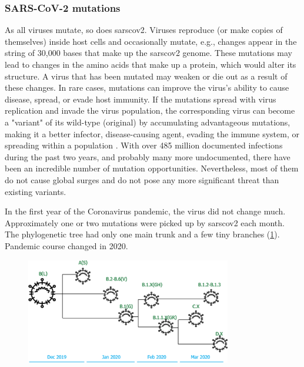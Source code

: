         \subsubsection{SARS-CoV-2 mutations}
        As all viruses mutate, so does \acrshort{sarscov2}. Viruses reproduce (or make copies of themselves) inside host cells and occasionally mutate, e.g., changes appear in the string of 30,000 bases that make up the \acrshort{sarscov2} genome. These mutations may lead to changes in the amino acids that make up a protein, which would alter its structure. A virus that has been mutated may weaken or die out as a result of these changes. In rare cases, mutations can improve the virus's ability to cause disease, spread, or evade host immunity. If the mutations spread with virus replication and invade the virus population, the corresponding virus can become a "variant" of its wild-type (original) by accumulating advantageous mutations, making it a better infector, disease-causing agent, evading the immune system, or spreading within a population \cite{variants}. With over 485 million documented infections during the past two years, and probably many more undocumented, there have been an incredible number of mutation opportunities.  Nevertheless, most of them do not cause global surges and do not pose any more significant threat than existing variants.
        
        In the first year of the Coronavirus pandemic, the virus did not change much. Approximately one or two mutations were picked up by \acrshort{sarscov2} each month. The phylogenetic tree had only one main trunk and a few tiny branches (\cref{fig:intro:corona-timeline}). Pandemic course changed in 2020.
        \begin{figure}[ht!]
        	\centering
        	\includegraphics[width=0.8\textwidth]{figures/intro/corona-timeline.png}
        	\label{fig:intro:corona-timeline}
        \end{figure}
